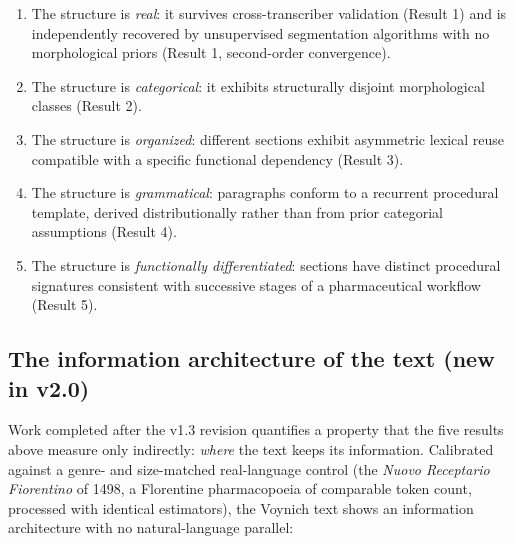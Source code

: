\documentclass[11pt,a4paper]{article}
\begin{document}
\begin{enumerate}[leftmargin=*,itemsep=2pt]
\item The structure is \textit{real}: it survives cross-transcriber validation (Result 1) and is independently recovered by unsupervised segmentation algorithms with no morphological priors (Result 1, second-order convergence).
\item The structure is \textit{categorical}: it exhibits structurally disjoint morphological classes (Result 2).
\item The structure is \textit{organized}: different sections exhibit asymmetric lexical reuse compatible with a specific functional dependency (Result 3).
\item The structure is \textit{grammatical}: paragraphs conform to a recurrent procedural template, derived distributionally rather than from prior categorial assumptions (Result 4).
\item The structure is \textit{functionally differentiated}: sections have distinct procedural signatures consistent with successive stages of a pharmaceutical workflow (Result 5).
\end{enumerate}

\subsection{The information architecture of the text (new in v2.0)}\label{sec:infoarch}

Work completed after the v1.3 revision quantifies a property that the five results above measure only indirectly: \textit{where} the text keeps its information. Calibrated against a genre- and size-matched real-language control (the \textit{Nuovo Receptario Fiorentino} of 1498, a Florentine pharmacopoeia of comparable token count, processed with identical estimators), the Voynich text shows an information architecture with no natural-language parallel:
\end{document}
